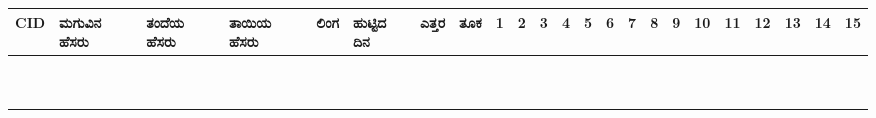 ﻿\documentclass[12pt]{article}
\newcommand{\kn}[1]{%
{\fontspec[Script=Kannada]{Kedage}%
#1
}}
\begin{document}
\begin{tabular}{|l|p{3.5cm}|p{3.5cm}|p{3.5cm}|p{1.5cm}|p{1.5cm}|l|l|l|l|l|l|l|l|l|l|l|l|l|l|l|l|l|}
CID & \kn{ಮಗುವಿನ ಹೆಸರು} & \kn{ತಂದೆಯ ಹೆಸರು} & \kn{ತಾಯಿಯ ಹೆಸರು} & \kn{ಲಿಂಗ} & \kn{ಹುಟ್ಟಿದ ದಿನ} & \kn{ಎತ್ತರ}& \kn{ತೂಕ} & 1 & 2 & 3 & 4 & 5 & 6 & 7 & 8 & 9 & 10 & 11 & 12 & 13 & 14 & 15 \\ \hline
 & & & & & & & & & & & & & & & & & & & & & &\\ \hline
 & & & & & & & & & & & & & & & & & & & & & &\\ \hline
 & & & & & & & & & & & & & & & & & & & & & &\\ \hline
 & & & & & & & & & & & & & & & & & & & & & &\\ \hline
 & & & & & & & & & & & & & & & & & & & & & &\\ \hline
 & & & & & & & & & & & & & & & & & & & & & &\\ \hline
 & & & & & & & & & & & & & & & & & & & & & &\\ \hline
 & & & & & & & & & & & & & & & & & & & & & &\\ \hline
 & & & & & & & & & & & & & & & & & & & & & &\\ \hline
 & & & & & & & & & & & & & & & & & & & & & &\\ \hline
\end{tabular}

\pagebreak

\end{document}
